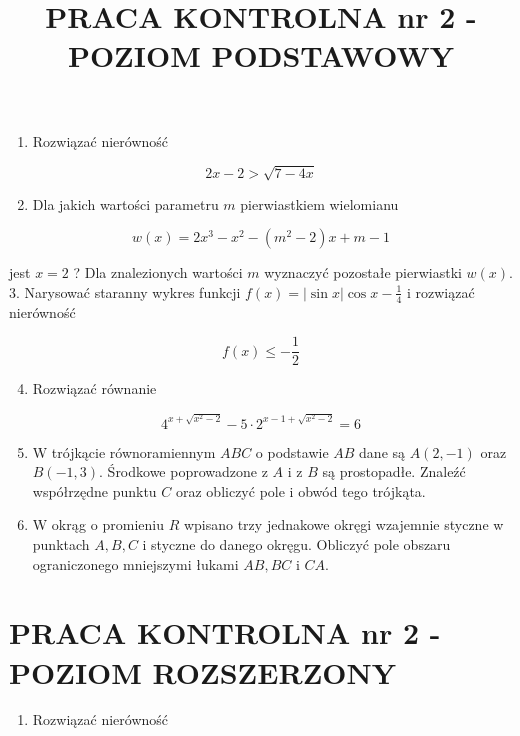\documentclass[10pt]{article}
\title{PRACA KONTROLNA nr 2 - POZIOM PODSTAWOWY }
\author{}
\date{}
\begin{document}
\maketitle
\begin{enumerate}
  \item Rozwiązać nierówność
\end{enumerate}

$$
2 x-2>\sqrt{7-4 x}
$$

\begin{enumerate}
  \setcounter{enumi}{1}
  \item Dla jakich wartości parametru $m$ pierwiastkiem wielomianu
\end{enumerate}

$$
w(x)=2 x^{3}-x^{2}-\left(m^{2}-2\right) x+m-1
$$

jest $x=2$ ? Dla znalezionych wartości $m$ wyznaczyć pozostałe pierwiastki $w(x)$.\\
3. Narysować staranny wykres funkcji $f(x)=|\sin x| \cos x-\frac{1}{4}$ i rozwiązać nierówność

$$
f(x) \leqslant-\frac{1}{2}
$$

\begin{enumerate}
  \setcounter{enumi}{3}
  \item Rozwiązać równanie
\end{enumerate}

$$
4^{x+\sqrt{x^{2}-2}}-5 \cdot 2^{x-1+\sqrt{x^{2}-2}}=6
$$

\begin{enumerate}
  \setcounter{enumi}{4}
  \item W trójkącie równoramiennym $A B C$ o podstawie $A B$ dane są $A(2,-1)$ oraz $B(-1,3)$. Środkowe poprowadzone z $A$ i z $B$ są prostopadłe. Znaleźć współrzędne punktu $C$ oraz obliczyć pole i obwód tego trójkąta.
  \item W okrąg o promieniu $R$ wpisano trzy jednakowe okręgi wzajemnie styczne w punktach $A, B, C$ i styczne do danego okręgu. Obliczyć pole obszaru ograniczonego mniejszymi łukami $A B, B C$ i $C A$.
\end{enumerate}

\section*{PRACA KONTROLNA nr 2 - POZIOM ROZSZERZONY}
\begin{enumerate}
  \item Rozwiązać nierówność
\end{enumerate}
\end{document}
